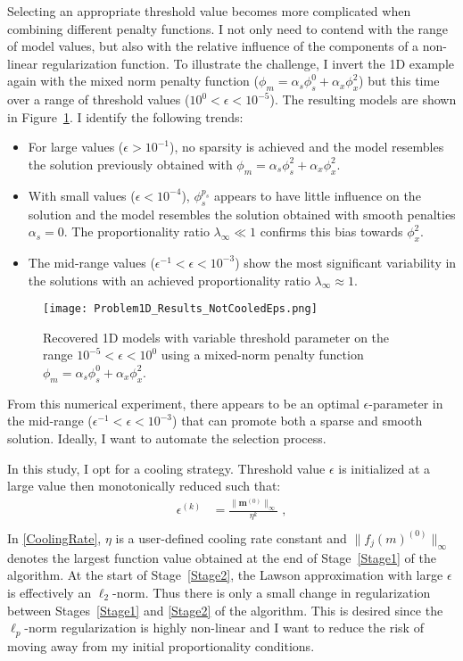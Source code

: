 Selecting an appropriate threshold value becomes more complicated when combining different penalty functions. I not only need to contend with the range of model values, but also with the relative influence of the components of a non-linear regularization function. To illustrate the challenge, I invert the 1D example again with the mixed norm penalty function ($\phi_m = \alpha_s\phi^0_s + \alpha_x\phi^2_x$) but this time over a range of threshold values ($10^{0} < \epsilon < 10^{-5}$). The resulting models are shown in Figure~\ref{Mixed1DnotCooledEps}. I identify the following trends:
\begin{itemize}
\item For large values ($\epsilon > 10^{-1}$), no sparsity is achieved and the model resembles the solution previously obtained with $\phi_m = \alpha_s \phi_s^2+\alpha_x \phi_x^2$.
\item With small values ($\epsilon < 10^{-4}$), $\phi_s^{p_s}$ appears to have little influence on the solution and the model resembles the solution obtained with smooth penalties $\alpha_s=0$. The proportionality ratio $\lambda_\infty \ll 1$ confirms this bias towards $\phi_x^2$.
\item The mid-range values ($\epsilon^{-1}<\epsilon < 10^{-3}$) show the most significant variability in the solutions with an achieved proportionality ratio $\lambda_\infty \approx 1$.
\end{itemize}
\begin{figure}
\texttt{[image: Problem1D\_Results\_NotCooledEps.png]}
\caption{Recovered 1D models with variable threshold parameter on the range $10^{-5} < \epsilon < 10^{0}$ using a mixed-norm penalty function $\phi_m = \alpha_s\phi^0_s + \alpha_x\phi^2_x$.
}
\label{Mixed1DnotCooledEps}
\end{figure}

From this numerical experiment, there appears to be an optimal $\epsilon$-parameter in the mid-range ($\epsilon^{-1}<\epsilon < 10^{-3}$) that can promote both a sparse and smooth solution.
Ideally, I want to automate the selection process.

In this study, I opt for a cooling strategy. Threshold value $\epsilon$ is initialized at a large value then monotonically reduced such that:
\begin{equation}\label{CoolingRate}
\begin{split}
\epsilon^{(k)} &=\frac{\|\mathbf{m}^{(0)}\|_\infty}{\eta^k}\;,\\
\end{split}
\end{equation}
In \eqref{CoolingRate}, $\eta$ is a user-defined cooling rate constant and $\|f_j({m})^{(0)}\|_\infty$ denotes the largest function value obtained at the end of Stage~\ref{Stage1} of the algorithm.
At the start of Stage~\ref{Stage2}, the Lawson approximation with large $\epsilon$ is effectively an $\ell_2$-norm. Thus there is only a small change in regularization between Stages~\ref{Stage1} and \ref{Stage2} of the algorithm.
This is desired since the $\ell_p$-norm regularization is highly non-linear and I want to reduce the risk of moving away from my initial proportionality conditions.

